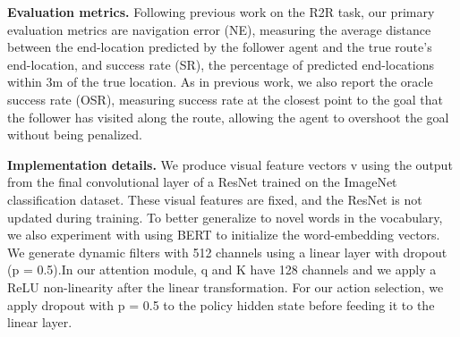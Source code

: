 \textbf{Evaluation metrics.} Following previous work on the R2R task, our primary evaluation metrics are navigation error (NE), measuring the average distance between the end-location predicted by the follower agent and the true route’s end-location, and success rate (SR), the percentage of predicted end-locations within 3m of the true location. As in previous work, we also report the oracle success rate (OSR), measuring success rate at the closest point to the goal that the follower has visited along the route, allowing the agent to overshoot the goal without being penalized.

\textbf{Implementation details.} We produce visual feature vectors v using the output from the final convolutional layer of a ResNet trained on the ImageNet classification dataset. These visual features are fixed, and the ResNet is not updated during training. To better generalize to novel words in the vocabulary, we also experiment with using BERT to initialize the word-embedding vectors. We generate dynamic filters with 512 channels using a linear layer with dropout (p = 0.5).In our attention module, q and K have 128 channels and we apply a ReLU non-linearity after the linear transformation. For our action selection, we apply dropout with p = 0.5 to the policy hidden state before feeding it to the linear layer.
\vspace{-2em}
